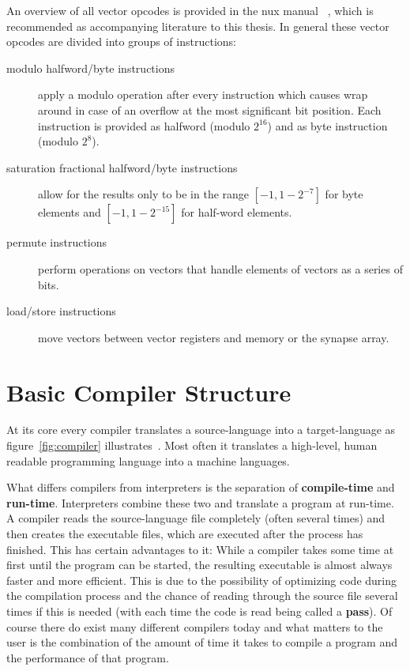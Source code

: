 {An overview of all vector opcodes is provided in the nux manual ~\cite[ch.~5]{nuxmanual}, which is recommended as accompanying literature to this thesis.
In general these vector opcodes are divided into groups of instructions:
\begin{description}
    \item[modulo halfword/byte instructions] apply a modulo operation after every instruction which causes wrap around in case of an overflow at the most significant bit position.
        Each instruction is provided as halfword (modulo $2^{16}$) and as byte instruction (modulo $2^{8}$).
    \item[saturation fractional halfword/byte instructions] allow for the results only to be in the range $[-1, 1-2^{-7}]$ for byte elements and $[-1, 1-2^{-15}]$ for half-word elements.
    \item[permute instructions] perform operations on vectors that handle elements of vectors as a series of bits.
    \item[load/store instructions] move vectors between vector registers and memory or the synapse array.
\end{description}


\section{Basic Compiler Structure}
\label{section:compiler}

At its core every compiler translates a source-language into a target-language as figure~\ref{fig:compiler} illustrates~\cite[p.~3]{UBHD-66483012}.
Most often it translates a high-level, human readable programming language into a machine languages.

What differs compilers from interpreters is the separation of \textbf{compile-time} and \textbf{run-time}.
Interpreters combine these two and translate a program at run-time.
A compiler reads the source-language file completely (often several times) and then creates the executable files, which are executed after the process has finished.
This has certain advantages to it:
While a compiler takes some time at first until the program can be started, the resulting executable is almost always faster and more efficient.
This is due to the possibility of optimizing code during the compilation process and the chance of reading through the source file several times if this is needed (with each time the code is read being called a \textbf{pass}).
Of course there do exist many different compilers today and what matters to the user is the combination of the amount of time it takes to compile a program and the performance of that program.

}
